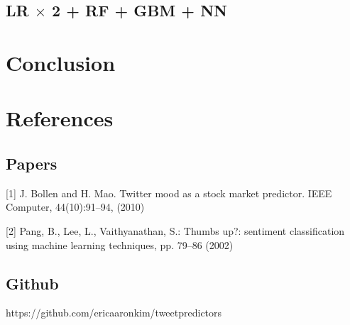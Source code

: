 \documentclass{article}
\begin{document}
\subsection{LR $\times$ 2 + RF + GBM + NN}

\section{Conclusion}

\section{References}

\subsection{Papers}
[1] J. Bollen and H. Mao. Twitter mood as a stock market
predictor. IEEE Computer, 44(10):91–94, (2010)

[2] Pang, B., Lee, L., Vaithyanathan, S.: Thumbs up?: sentiment classification using machine
learning techniques, pp. 79–86 (2002)

\subsection{Github}
https://github.com/ericaaronkim/tweetpredictors
\end{document}
